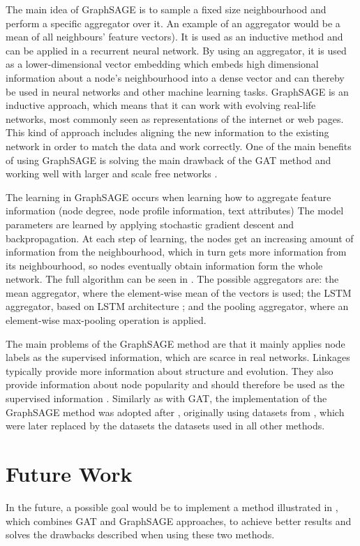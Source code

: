 \documentclass[11pt,journal,compsoc]{article}
\begin{document}
The main idea of GraphSAGE \cite{article} is to sample a fixed size neighbourhood and perform a specific aggregator over it. An example of an aggregator would be a mean of all neighbours' feature vectors). It is used as an inductive method and can be applied in a recurrent neural network. By using an aggregator, it is used as a lower-dimensional vector embedding which embeds high dimensional information about a node's neighbourhood into a dense vector and can thereby be used in neural networks and other machine learning tasks. GraphSAGE is an inductive approach, which means that it can work with evolving real-life networks, most commonly seen as representations of the internet or web pages. This kind of approach includes aligning the new information to the existing network in order to match the data and work correctly. One of the main benefits of using GraphSAGE is solving the main drawback of the GAT method and working well with larger and scale free networks \cite{gu2019link}.

The learning in GraphSAGE occurs when learning how to aggregate feature information (node degree, node profile information, text attributes) The model parameters are learned by applying stochastic gradient descent and backpropagation. At each step of learning, the nodes get an increasing amount of information from the neighbourhood, which in turn gets more information from its neighbourhood, so nodes eventually obtain information form the whole network. The full algorithm can be seen in \cite{article}. The possible aggregators are: the mean aggregator, where the element-wise mean of the vectors is used; the LSTM aggregator, based on LSTM architecture \cite{lstm}; and the pooling aggregator, where an element-wise max-pooling operation is applied.

The main problems of the GraphSAGE method are that it mainly applies node labels as the supervised information, which are scarce in real networks. Linkages typically provide more information about structure and evolution. They also provide information about node popularity and should therefore be used as the supervised information \cite{gu2019link}. Similarly as with GAT, the implementation of the GraphSAGE method was adopted after \cite{gagflp}, originally using datasets from \cite{nr}, which were later replaced by the datasets the datasets used in all other methods.


\section{Future Work}

In the future, a possible goal would be to implement a method illustrated in \cite{gu2019link}, which combines GAT and GraphSAGE approaches, to achieve better results and solves the drawbacks described when using these two methods.





\end{document}
